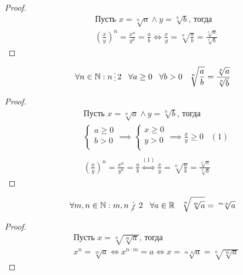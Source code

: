 \begin{proof}
    \hfill
    \begin{align*}
        &\text{Пусть } x = \sqrt[n]{a} \land y = \sqrt[n]{b} \text{, тогда}\\
        &\left(\frac{x}{y}\right)^n = \frac{x^n}{y^n} = \frac{a}{b} \iff \frac{x}{y} = \sqrt[n]{\frac{a}{b}} = \frac{\sqrt[n]{a}}{\sqrt[n]{b}}
    \end{align*}
\end{proof}

\begin{theorem}
    \begin{align*}
        \forall n \in \mathbb{N}: n \divisible 2 \;\;\; \forall a \ge 0  \;\;\; \forall b > 0 \;\;\; \sqrt[n]{\frac{a}{b}} = \frac{\sqrt[n]{a}}{\sqrt[n]{b}}
    \end{align*}
\end{theorem}

\begin{proof}
    \hfill
    \begin{align*}
        &\text{Пусть } x = \sqrt[n]{a} \land y = \sqrt[n]{b} \text{, тогда}\\
        &\left\{\begin{array}{l}
            a \ge 0 \\
            b > 0 \\
        \end{array}\right. \implies
        \left\{\begin{array}{l}
            x \ge 0 \\
            y > 0 \\
        \end{array}\right. \implies
        \frac{x}{y} \ge 0 \;\;\; (1)
        \\ \\
        &\left(\frac{x}{y}\right)^n = \frac{x^n}{y^n} = \frac{a}{b} \overset{(1)}{\iff} \frac{x}{y} = \sqrt[n]{\frac{a}{b}} = \frac{\sqrt[n]{a}}{\sqrt[n]{b}}
    \end{align*}
\end{proof}

\begin{theorem}
    \begin{align*}
        \forall m,n \in \mathbb{N}: m,n \notdivisible 2 \;\;\; \forall a \in \mathbb{R} \;\;\; \sqrt[n]{\sqrt[m]{a}} = \sqrt[m \cdot n]{a}
    \end{align*}
\end{theorem}

\begin{proof}
    \hfill
    \begin{align*}
        &\text{Пусть } x = \sqrt[n]{\sqrt[m]{a}} \text{, тогда} \\
        &x^n = \sqrt[m]{a} \iff
        x^{n \cdot m} = a \iff
        x = \sqrt[m \cdot n]{a} = \sqrt[n]{\sqrt[m]{a}}
    \end{align*}
\end{proof}

